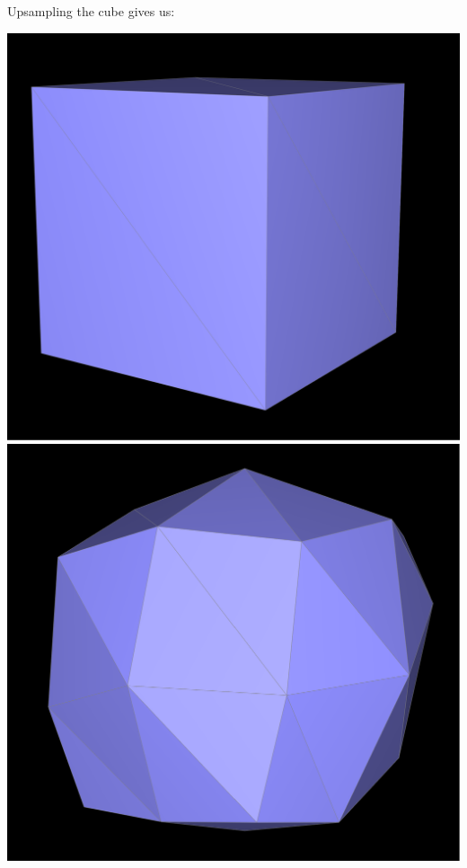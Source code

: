 \documentclass{article}
\begin{document}
\\
\\
Upsampling the cube gives us:
\begin{center}
    \includegraphics[]{task 6/cube1.png}
    \includegraphics[]{task 6/cube2.png}


\end{center}
\end{document}

